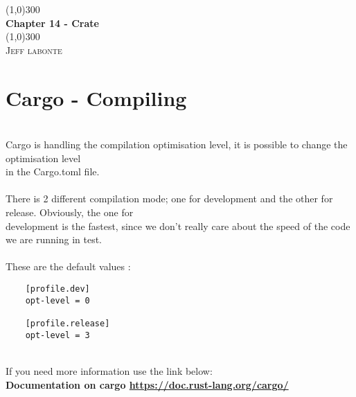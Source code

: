 \documentclass{article}
\begin{document}
  \begin{titlepage}
    \begin{center}
      \line(1,0){300} \\
      [0.25in]
      \huge{\bfseries Chapter 14 - Crate}\\
      [2mm]
      \line(1,0){300}\\
      [1.5cm]
      \textsc{\LARGE Jeff labonte}\\
      [0.75cm]
    \end{center}
  \end{titlepage}
  \section {Cargo - Compiling}
  \ \\[2mm]
  Cargo is handling the compilation optimisation level, it is possible to change the optimisation level \\
  in the Cargo.toml file. \\
  \ \\[2mm]
  There is 2 different compilation mode; one for development and the other for release. Obviously, the one for\\
  development is the fastest, since we don't really care about the speed of the code we are running in test. \\
  \ \\[2mm]
  These are the default values :
  \begin{lstlisting}
    [profile.dev]
    opt-level = 0

    [profile.release]
    opt-level = 3
  \end{lstlisting}
  \\[2mm]
  If you need more information use the link below: \\
  \textbf{ Documentation on cargo \url{https://doc.rust-lang.org/cargo/}}\\
\end{document}
